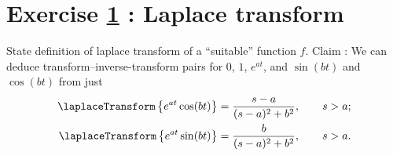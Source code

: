 




%
%
%
%
%

\section{Exercise \ref{sec : Math211 Summer2019 ExamOral Laplace Transform} : Laplace transform}
\label{sec : Math211 Summer2019 ExamOral Laplace Transform}

State definition of laplace transform of a ``suitable'' function $f$. Claim : We can deduce transform--inverse-transform pairs for $0$, $1$, $e^{a t}$, and $\sin(b t)$ and $\cos(b t)$ from just
\begin{align*}
\laplaceTransform\left\{e^{a t} \cos(b t)\right\}
&=
\frac{s - a}{(s - a)^{2} + b^{2}},
\qquad
s > a;
\\
\laplaceTransform\left\{e^{a t} \sin(b t)\right\}
&=
\frac{b}{(s - a)^{2} + b^{2}},
\qquad
s > a.
\end{align*}

